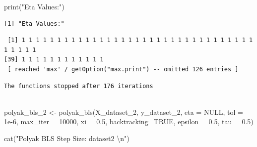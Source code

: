 \documentclass[
  letterpaper,
  DIV=11,
  numbers=noendperiod]{scrartcl}
\newenvironment{Shaded}{\begin{snugshade}}{\end{snugshade}}
\newcommand{\AttributeTok}[1]{\textcolor[rgb]{0.40,0.45,0.13}{#1}}
\newcommand{\ConstantTok}[1]{\textcolor[rgb]{0.56,0.35,0.01}{#1}}
\newcommand{\DecValTok}[1]{\textcolor[rgb]{0.68,0.00,0.00}{#1}}
\newcommand{\FloatTok}[1]{\textcolor[rgb]{0.68,0.00,0.00}{#1}}
\newcommand{\FunctionTok}[1]{\textcolor[rgb]{0.28,0.35,0.67}{#1}}
\newcommand{\NormalTok}[1]{\textcolor[rgb]{0.00,0.23,0.31}{#1}}
\newcommand{\OtherTok}[1]{\textcolor[rgb]{0.00,0.23,0.31}{#1}}
\newcommand{\SpecialCharTok}[1]{\textcolor[rgb]{0.37,0.37,0.37}{#1}}
\newcommand{\StringTok}[1]{\textcolor[rgb]{0.13,0.47,0.30}{#1}}
\begin{document}
\begin{Shaded}
\begin{Highlighting}[]
\FunctionTok{print}\NormalTok{(}\StringTok{"Eta Values:"}\NormalTok{)}
\end{Highlighting}
\end{Shaded}

\begin{verbatim}
[1] "Eta Values:"
\end{verbatim}

\begin{Shaded}
\end{Shaded}

\begin{verbatim}
 [1] 1 1 1 1 1 1 1 1 1 1 1 1 1 1 1 1 1 1 1 1 1 1 1 1 1 1 1 1 1 1 1 1 1 1 1 1 1 1
[39] 1 1 1 1 1 1 1 1 1 1 1 1
 [ reached 'max' / getOption("max.print") -- omitted 126 entries ]
\end{verbatim}

\begin{Shaded}
\end{Shaded}

\begin{verbatim}
The functions stopped after 176 iterations 
 
\end{verbatim}

\begin{Shaded}
\begin{Highlighting}[]
\NormalTok{polyak\_bls\_2 }\OtherTok{\textless{}{-}} \FunctionTok{polyak\_bls}\NormalTok{(X\_dataset\_2, y\_dataset\_2, }\AttributeTok{eta =} \ConstantTok{NULL}\NormalTok{, }\AttributeTok{tol =} \FloatTok{1e{-}6}\NormalTok{, }\AttributeTok{max\_iter =} \DecValTok{10000}\NormalTok{, }\AttributeTok{xi =} \FloatTok{0.5}\NormalTok{, }\AttributeTok{backtracking=}\ConstantTok{TRUE}\NormalTok{, }\AttributeTok{epsilon =} \FloatTok{0.5}\NormalTok{, }\AttributeTok{tau =} \FloatTok{0.5}\NormalTok{)}

\FunctionTok{cat}\NormalTok{(}\StringTok{"Polyak BLS Step Size: dataset2 }\SpecialCharTok{\textbackslash{}n}\StringTok{"}\NormalTok{)}
\end{Highlighting}
\end{Shaded}
\end{document}
